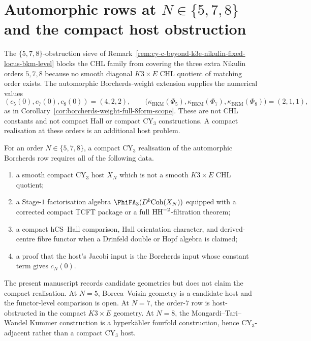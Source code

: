 \section{Automorphic rows at \texorpdfstring{$N \in \{5, 7, 8\}$}{N in 5, 7, 8} and the compact host obstruction}
\label{sec:cy-c-beyond-non-chl-hosts}

The $\{5, 7, 8\}$-obstruction sieve of
Remark~\ref{rem:cy-c-beyond-k3e-nikulin-fixed-locus-bkm-level} blocks
the CHL family from covering the three extra Nikulin orders $5, 7, 8$
because no smooth diagonal $K3\times E$ CHL quotient of matching order
exists. The automorphic Borcherds-weight extension supplies the numerical
values
\[
 (c_5(0),c_7(0),c_8(0))=(4,2,2),\qquad
 \bigl(\kappa_{\mathrm{BKM}}(\Phi_5),\kappa_{\mathrm{BKM}}(\Phi_7),\kappa_{\mathrm{BKM}}(\Phi_8)\bigr)=(2,1,1),
\]
as in Corollary~\ref{cor:borcherds-weight-full-8form-scope}. These
are not CHL constants and not compact Hall or compact CY$_3$
constructions. A compact realisation at these orders is an additional
host problem.

\begin{conjecture}
\label{thm:cy-c-beyond-non-chl-hosts-5-7-8}
\ClaimStatusConjectured
For an order \(N\in\{5,7,8\}\), a compact CY$_3$ realisation of the
automorphic Borcherds row requires all of the following data.
\begin{enumerate}[label=\textup{(\roman*)}]
 \item a smooth compact CY$_3$ host \(X_N\) which is not a smooth
 \(K3\times E\) CHL quotient;
 \item a Stage-$1$ factorisation algebra \(\PhiFA_3(D^b\Coh(X_N))\)
 equipped with a corrected compact TCFT package or a full
 \(\mathrm{HH}^{-2}\)-filtration theorem;
 \item a compact hCS--Hall comparison, Hall orientation character, and
 derived-centre fibre functor when a Drinfeld double or Hopf algebra is
 claimed;
 \item a proof that the host's Jacobi input is the Borcherds input whose
 constant term gives \(c_N(0)\).
\end{enumerate}
The present manuscript records candidate geometries but does not claim
the compact realisation. At \(N=5\), Borcea--Voisin geometry is a
candidate host and the functor-level comparison is open. At \(N=7\), the
order-$7$ row is host-obstructed in the compact \(K3\times E\) geometry.
At \(N=8\), the Mongardi--Tari--Wandel Kummer construction is a
hyperk\"ahler fourfold construction, hence CY$_3$-adjacent rather than a
compact CY$_3$ host.
\end{conjecture}

